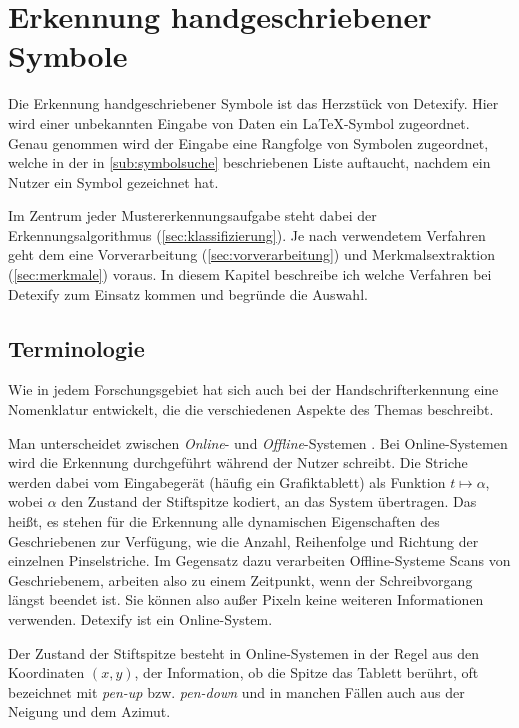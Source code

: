 

\chapter{Erkennung handgeschriebener Symbole} 

\label{cha:erkennung_handgeschriebener_symbole}

Die Erkennung handgeschriebener Symbole ist das Herzstück von Detexify. Hier wird einer unbekannten Eingabe von Daten ein \LaTeX-Symbol zugeordnet. Genau genommen wird der Eingabe eine Rangfolge von Symbolen zugeordnet, welche in der in \ref{sub:symbolsuche} beschriebenen Liste auftaucht, nachdem ein Nutzer ein Symbol gezeichnet hat.

Im Zentrum jeder Mustererkennungsaufgabe steht dabei der Erkennungsalgorithmus (\ref{sec:klassifizierung}). Je nach verwendetem Verfahren geht dem eine Vorverarbeitung (\ref{sec:vorverarbeitung}) und Merkmalsextraktion (\ref{sec:merkmale}) voraus. In diesem Kapitel beschreibe ich welche Verfahren bei Detexify zum Einsatz kommen und begründe die Auswahl.

\section{Terminologie} 

\label{sec:terminologie}

Wie in jedem Forschungsgebiet hat sich auch bei der Handschrifterkennung eine Nomenklatur entwickelt, die die verschiedenen Aspekte des Themas beschreibt.

Man unterscheidet zwischen \emph{Online}- und \emph{Offline}-Systemen \cite{Tappert:1990p10302}. Bei Online-Systemen wird die Erkennung durchgeführt während der Nutzer schreibt. Die Striche werden dabei vom Eingabegerät (häufig ein Grafiktablett) als Funktion $ t \mapsto \alpha $, wobei $\alpha$ den Zustand der Stiftspitze kodiert, an das System übertragen. Das heißt, es stehen für die Erkennung alle dynamischen Eigenschaften des Geschriebenen zur Verfügung, wie die Anzahl, Reihenfolge und Richtung der einzelnen Pinselstriche. Im Gegensatz dazu verarbeiten Offline-Systeme Scans von Geschriebenem, arbeiten also zu einem Zeitpunkt, wenn der Schreibvorgang längst beendet ist. Sie können also außer Pixeln keine weiteren Informationen verwenden. Detexify ist ein Online-System.

Der Zustand der Stiftspitze besteht in Online-Systemen in der Regel aus den Koordinaten $(x,y)$, der Information, ob die Spitze das Tablett berührt, oft bezeichnet mit \emph{pen-up} bzw. \emph{pen-down} und in manchen Fällen auch aus der Neigung und dem Azimut.

